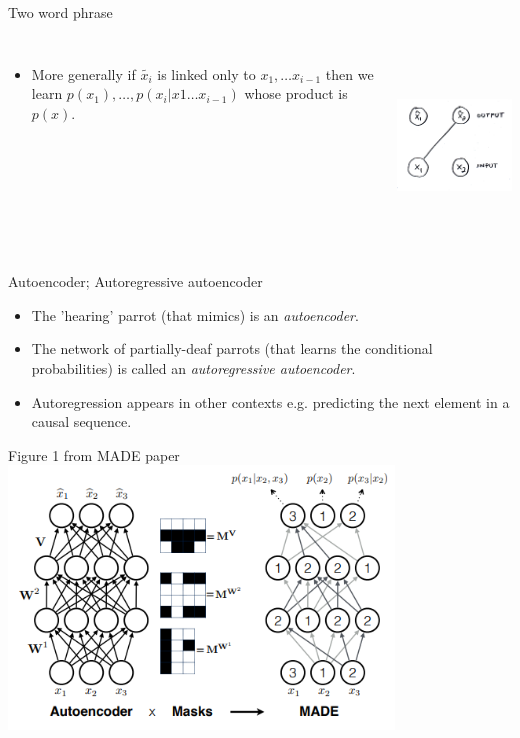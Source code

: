 \documentclass[usenames,dvipsnames]{beamer}
\begin{document}
\begin{frame}{Two word phrase}
	\begin{columns}
    \begin{itemize}
    \item{More generally if $\tilde{x_i}$ is linked only to $x_1, \dots x_{i-1}$ then we learn $p(x_1), \dots, p(x_i | x1 \dots x_{i-1})$ whose product is $p(x)$.}
    \end{itemize}
             \centering
             \includegraphics[height=5cm]{image_03}
         \end{columns} 
\end{frame}

\begin{frame}{Autoencoder; Autoregressive autoencoder}
    \begin{itemize}
      \item{The 'hearing' parrot (that mimics) is an \textit{autoencoder}.}
	\item{The network of partially-deaf parrots (that learns the conditional probabilities) is called an \textit{autoregressive autoencoder}.}
	\item{Autoregression appears in other contexts e.g. predicting the next element in a causal sequence.}
    \end{itemize}
\end{frame}

\begin{frame}{Figure 1 from MADE paper}
     \centering
     \includegraphics[height=7cm]{image_04}
\end{frame}
\end{document}
